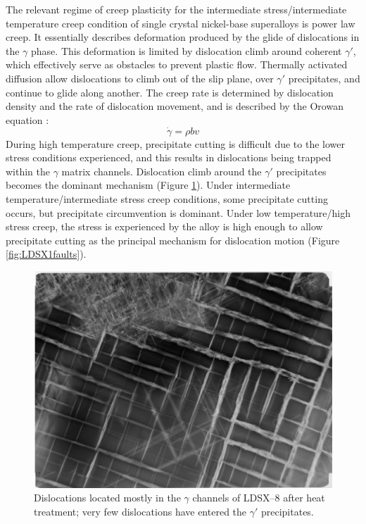 The relevant regime of creep plasticity for the intermediate stress/intermediate temperature creep condition of single crystal nickel-base superalloys is power law creep.  It essentially describes deformation produced by the glide of dislocations in the $\gamma$ phase.  This deformation is limited by dislocation climb around coherent $\gamma'$, which effectively serve as obstacles to prevent plastic flow.  Thermally activated diffusion allow dislocations to climb out of the slip plane, over $\gamma'$ precipitates, and continue to glide along another.  The creep rate is determined by dislocation density and the rate of dislocation movement, and is described by the Orowan equation \cite{nabarro95}:
%
\begin{equation}
\dot{\gamma}  = \rho  b  v  
\end{equation}
%
During high temperature creep, precipitate cutting is difficult due to the lower stress conditions experienced, and this results in dislocations being trapped within the $\gamma$ matrix channels.  Dislocation climb around the $\gamma'$ precipitates becomes the dominant mechanism (Figure \ref{fig:LDSX8disloc}).  Under intermediate temperature/intermediate stress creep conditions, some precipitate cutting occurs, but precipitate circumvention is dominant.  Under low temperature/high stress creep, the stress is experienced by the alloy is high enough to allow precipitate cutting as the principal mechanism for dislocation motion (Figure \ref{fig:LDSX1faults}).
%
\vspace{1cm}
\begin{figure}[H]
\begin{center}
\includegraphics{LDSX8disloc}
\caption{Dislocations located mostly in the $\gamma$ channels of LDSX--8 after heat treatment; very few dislocations have entered the $\gamma'$ precipitates.}\label{fig:LDSX8disloc}
\end{center}
\end{figure}
%

